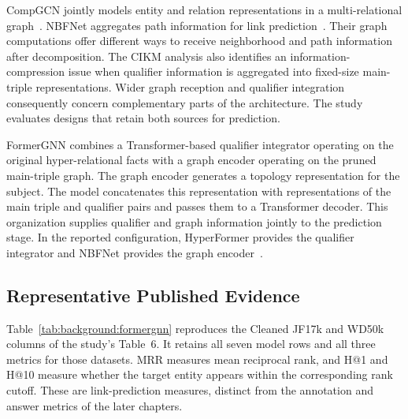 CompGCN jointly models entity and relation representations in a multi-relational graph~\cite{bg-compgcn}. NBFNet aggregates path information for link prediction~\cite{bg-nbfnet}. Their graph computations offer different ways to receive neighborhood and path information after decomposition. The CIKM analysis also identifies an information-compression issue when qualifier information is aggregated into fixed-size main-triple representations. Wider graph reception and qualifier integration consequently concern complementary parts of the architecture. The study evaluates designs that retain both sources for prediction.

FormerGNN combines a Transformer-based qualifier integrator operating on the original hyper-relational facts with a graph encoder operating on the pruned main-triple graph. The graph encoder generates a topology representation for the subject. The model concatenates this representation with representations of the main triple and qualifier pairs and passes them to a Transformer decoder. This organization supplies qualifier and graph information jointly to the prediction stage. In the reported configuration, HyperFormer provides the qualifier integrator and NBFNet provides the graph encoder~\cite{bg-hyperformer,bg-nbfnet}.

\subsection{Representative Published Evidence}

Table~\ref{tab:background:formergnn} reproduces the Cleaned JF17k and WD50k columns of the study's Table~6. It retains all seven model rows and all three metrics for those datasets. MRR measures mean reciprocal rank, and H@1 and H@10 measure whether the target entity appears within the corresponding rank cutoff. These are link-prediction measures, distinct from the annotation and answer metrics of the later chapters.

